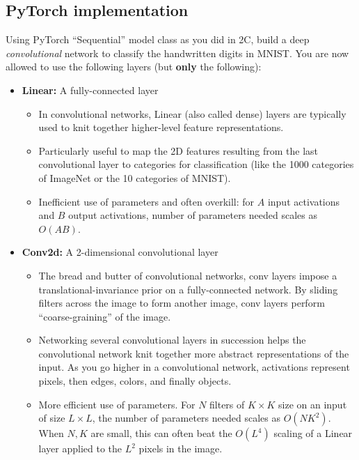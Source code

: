 \newpage


\subsection{PyTorch implementation}
\problem[20]

Using PyTorch ``Sequential'' model class as you did in 2C, build a deep \emph{convolutional}
network to classify the handwritten digits in MNIST. You are now allowed to use
the following layers (but \textbf{only} the following):

 \begin{itemize}
  \item \textbf{Linear:} A fully-connected layer
  \begin{itemize}
    \item In convolutional networks, Linear (also called dense) layers are typically used to knit together higher-level feature representations.
    \item Particularly useful to map the 2D features resulting from the last convolutional layer to categories for classification (like the 1000 categories of ImageNet or the 10 categories of MNIST).
    \item Inefficient use of parameters and often overkill: for $A$ input activations and $B$ output activations, number of parameters needed scales as $O(AB)$.
  \end{itemize}
  \item \textbf{Conv2d:} A 2-dimensional convolutional layer
  \begin{itemize}
    \item The bread and butter of convolutional networks, conv layers impose a translational-invariance prior on a fully-connected network. By sliding filters across the image to form another image, conv layers perform ``coarse-graining'' of the image.
    \item Networking several convolutional layers in succession helps the convolutional network knit together more abstract representations of the input. As you go higher in a convolutional network, activations represent pixels, then edges, colors, and finally objects.
    \item More efficient use of parameters. For $N$ filters of $K \times K$ size on an input of size $L \times L$, the number of parameters needed scales as $O(N K^2)$. When $N, K$ are small, this can often beat the $O(L^4)$ scaling of a Linear layer applied to the $L^2$ pixels in the image.


\end{itemize}
\end{itemize}
